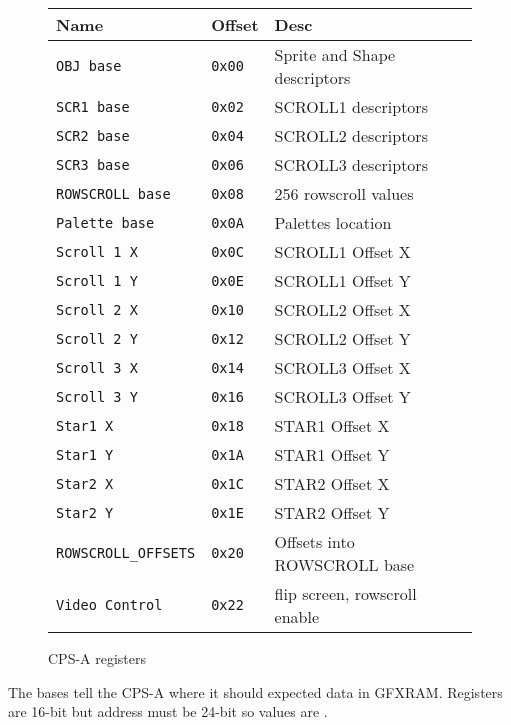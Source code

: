  \begin{figure}[H]
\begin{tabularx}{\textwidth}{llX}
  \toprule    
  \textbf{Name } & \textbf{ Offset }  & \textbf{Desc }  \\     
  \toprule   
  \texttt{OBJ base}  &  \texttt{0x00} & Sprite and Shape descriptors   \\   
\texttt{SCR1 base} &  \texttt{0x02}  & SCROLL1 descriptors   \\         
\texttt{SCR2 base} &  \texttt{0x04}  & SCROLL2 descriptors   \\     
\texttt{SCR3 base}&  \texttt{0x06}   & SCROLL3 descriptors  \\     
\texttt{ROWSCROLL base} &  \texttt{0x08}  & 256 rowscroll values   \\     
\texttt{Palette base} &  \texttt{0x0A}  & Palettes location   \\   
  \toprule   
\texttt{Scroll 1 X} &  \texttt{0x0C}  & SCROLL1 Offset X  \\ 
\texttt{Scroll 1 Y} &  \texttt{0x0E}  & SCROLL1 Offset Y    \\   
\texttt{Scroll 2 X} &  \texttt{0x10}  & SCROLL2 Offset X    \\ 
\texttt{Scroll 2 Y} &  \texttt{0x12}  & SCROLL2 Offset Y    \\   
\texttt{Scroll 3 X} &  \texttt{0x14}  & SCROLL3 Offset X    \\ 
\texttt{Scroll 3 Y} &  \texttt{0x16}  & SCROLL3 Offset Y    \\     
  \toprule   
\texttt{Star1    X} &  \texttt{0x18}  & STAR1   Offset X    \\  
\texttt{Star1    Y} &  \texttt{0x1A}  & STAR1   Offset Y    \\  
\texttt{Star2    X} &  \texttt{0x1C}  & STAR2   Offset X    \\  
\texttt{Star2    Y} &  \texttt{0x1E}  & STAR2   Offset Y    \\  
  \toprule   
\texttt{ROWSCROLL\_OFFSETS} &  \texttt{0x20}  & Offsets into ROWSCROLL base\\
\texttt{Video Control} &  \texttt{0x22}  & flip screen, rowscroll enable\\
  \toprule   
\end{tabularx}
\caption*{CPS-A registers}
\end{figure}

The bases tell the CPS-A where it should expected data in GFXRAM. Registers are 16-bit but address must be 24-bit so values are . 

